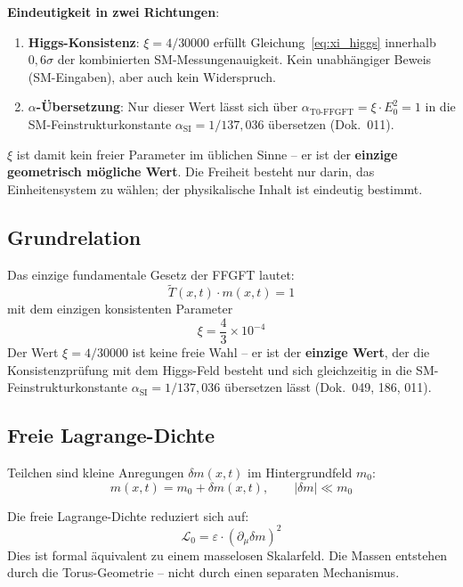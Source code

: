 \textbf{Eindeutigkeit in zwei Richtungen}:
\begin{enumerate}
    \item \textbf{Higgs-Konsistenz}: $\xi = 4/30000$ erfüllt
          Gleichung~\eqref{eq:xi_higgs} innerhalb $0{,}6\sigma$
          der kombinierten SM-Messungenauigkeit.
          Kein unabhängiger Beweis (SM-Eingaben), aber auch
          kein Widerspruch.
    \item \textbf{$\alpha$-Übersetzung}: Nur dieser Wert lässt sich
          über $\alpha_{\text{T0-FFGFT}} = \xi \cdot E_0^2 = 1$ in die
          SM-Feinstrukturkonstante $\alpha_{\text{SI}} = 1/137{,}036$
          übersetzen (Dok.~011).
\end{enumerate}

$\xi$ ist damit kein freier Parameter im üblichen Sinne -- er ist
der \textbf{einzige geometrisch mögliche Wert}. Die Freiheit
besteht nur darin, das Einheitensystem zu wählen; der physikalische
Inhalt ist eindeutig bestimmt.

\subsection{Grundrelation}

Das einzige fundamentale Gesetz der FFGFT lautet:
\begin{equation}
    \tilde{T}(x,t) \cdot m(x,t) = 1
    \label{eq:fundamental}
\end{equation}
mit dem einzigen konsistenten Parameter
\begin{equation}
    \xi = \frac{4}{3} \times 10^{-4}
\end{equation}
Der Wert $\xi = 4/30000$ ist keine freie Wahl -- er ist der
\textbf{einzige Wert}, der die Konsistenzprüfung mit dem
Higgs-Feld besteht und sich gleichzeitig in die
SM-Feinstrukturkonstante $\alpha_{\text{SI}} = 1/137{,}036$
übersetzen lässt (Dok.~049, 186, 011).

\subsection{Freie Lagrange-Dichte}

Teilchen sind kleine Anregungen $\delta m(x,t)$ im Hintergrundfeld $m_0$:
\begin{equation}
    m(x,t) = m_0 + \delta m(x,t), \qquad |\delta m| \ll m_0
\end{equation}

Die freie Lagrange-Dichte reduziert sich auf:
\begin{equation}
    \mathcal{L}_0 = \varepsilon \cdot (\partial_\mu \delta m)^2
    \label{eq:L0}
\end{equation}
Dies ist formal äquivalent zu einem masselosen Skalarfeld. Die
Massen entstehen durch die Torus-Geometrie -- nicht durch einen
separaten Mechanismus.

